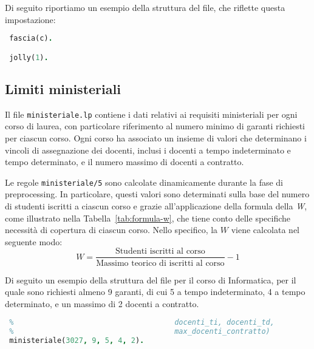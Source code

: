 Di seguito riportiamo un esempio della struttura del file, che riflette questa impostazione:

\begin{lstlisting}[language=prolog, caption={Esempio struttura dati di \texttt{docenti\_a\_contratto.lp}.}]
 %  SEZIONE: FASCIE
 fascia(c).

 jolly(1).
\end{lstlisting}


\subsection{Limiti ministeriali}\label{sec:rules-ministeriale}

Il file \texttt{ministeriale.lp} contiene i dati relativi ai requisiti ministeriali per 
ogni corso di laurea, con particolare riferimento al numero minimo di garanti richiesti 
per ciascun corso. Ogni corso ha associato un insieme di valori che determinano i vincoli 
di assegnazione dei docenti, inclusi i docenti a tempo indeterminato e tempo determinato,
e il numero massimo di docenti a contratto.

Le regole \texttt{ministeriale/5} sono calcolate dinamicamente durante la fase di 
preprocessing. In particolare, questi valori sono determinati sulla base del numero di 
studenti iscritti a ciascun corso e grazie all'applicazione della formula della \textit{W}, 
come illustrato nella Tabella~\ref{tab:formula-w}, che tiene conto delle specifiche 
necessità di copertura di ciascun corso. Nello specifico, la $W$ viene calcolata nel 
seguente modo:
$$
W = \frac{
        \text{Studenti iscritti al corso}
    }
    {
        \text{Massimo teorico di iscritti al corso}
    }
    - 1
$$

Di seguito un esempio della struttura del file per il corso di Informatica, per 
il quale sono richiesti almeno 9 garanti, di cui 5 a tempo indeterminato, 4 a tempo 
determinato, e un massimo di 2 docenti a contratto. 

\begin{lstlisting}[language=prolog, caption={Esempio struttura dati di \texttt{ministeriale.lp}.}]    
 %  SEZIONE: Garanti minimi per corso (codice_corso, minimo_complessivo, 
 %                                     docenti_ti, docenti_td, 
 %                                     max_docenti_contratto)
 ministeriale(3027, 9, 5, 4, 2).
\end{lstlisting} 

